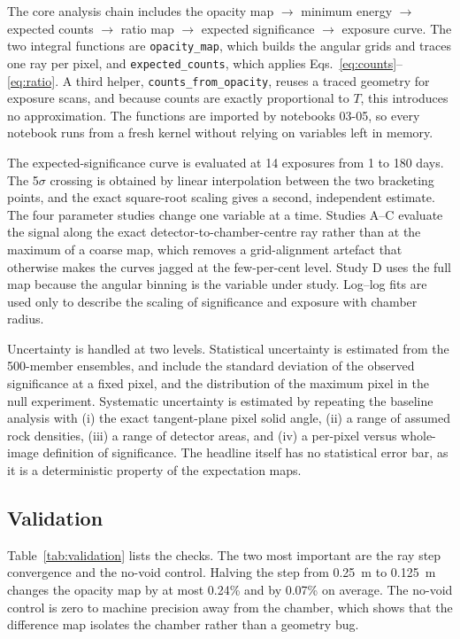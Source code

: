 \documentclass{article}
\begin{document}
The core analysis chain includes the opacity map $\rightarrow$ minimum energy
$\rightarrow$ expected counts $\rightarrow$ ratio map $\rightarrow$ expected
significance $\rightarrow$ exposure curve. The two integral functions are
\texttt{opacity\_map}, which builds the angular grids and traces one ray per
pixel, and \texttt{expected\_counts}, which applies
Eqs.~\eqref{eq:counts}--\eqref{eq:ratio}. A third helper,
\texttt{counts\_from\_opacity}, reuses a traced geometry for exposure scans, and
because counts are exactly proportional to $T$, this introduces no
approximation. The functions are imported by notebooks 03-05, so every
notebook runs from a fresh kernel without relying on variables left in memory.

The expected-significance curve is evaluated at 14 exposures from 1 to 180 days.
The 5$\sigma$ crossing is obtained by linear interpolation between the two
bracketing points, and the exact square-root scaling gives a second, independent
estimate. The four parameter studies change one variable at a time. Studies
A--C evaluate the signal along the exact detector-to-chamber-centre ray rather
than at the maximum of a coarse map, which removes a grid-alignment artefact
that otherwise makes the curves jagged at the few-per-cent level. Study D uses
the full map because the angular binning is the variable under study. Log--log
fits are used only to describe the scaling of significance and exposure with
chamber radius.

Uncertainty is handled at two levels. Statistical uncertainty is estimated from
the 500-member ensembles, and include the standard deviation of the observed significance
at a fixed pixel, and the distribution of the maximum pixel in the null
experiment. Systematic uncertainty is estimated by repeating the baseline
analysis with (i) the exact tangent-plane pixel solid angle, (ii) a range of
assumed rock densities, (iii) a range of detector areas, and (iv) a per-pixel
versus whole-image definition of significance. The headline itself has no
statistical error bar, as it is a deterministic property of the expectation maps.

\subsection{Validation}

Table~\ref{tab:validation} lists the checks. The two most important are the ray
step convergence and the no-void control. Halving the step from 0.25~m to
0.125~m changes the opacity map by at most 0.24\% and by 0.07\% on average. The
no-void control is zero to machine precision away from the chamber, which shows
that the difference map isolates the chamber rather than a geometry bug.
\end{document}
